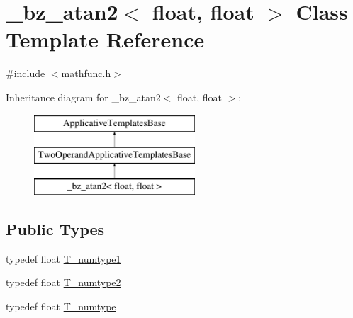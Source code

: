 \hypertarget{class__bz__atan2_3_01float_00_01float_01_4}{}\section{\+\_\+bz\+\_\+atan2$<$ float, float $>$ Class Template Reference}
\label{class__bz__atan2_3_01float_00_01float_01_4}


{\ttfamily \#include $<$mathfunc.\+h$>$}

Inheritance diagram for \+\_\+bz\+\_\+atan2$<$ float, float $>$\+:\begin{figure}[H]
\begin{center}
\leavevmode
\includegraphics[height=3.000000cm]{class__bz__atan2_3_01float_00_01float_01_4}
\end{center}
\end{figure}
\subsection*{Public Types}
\begin{DoxyCompactItemize}
\item 
typedef float \hyperlink{class__bz__atan2_3_01float_00_01float_01_4_a9010222958faf35b39d64435d13ac0e4}{T\+\_\+numtype1}
\item 
typedef float \hyperlink{class__bz__atan2_3_01float_00_01float_01_4_a096f32debf3cf0e75bf955ef2c6fd44e}{T\+\_\+numtype2}
\item 
typedef float \hyperlink{class__bz__atan2_3_01float_00_01float_01_4_a9dc9e00c8eb66cce61fb805cd67b0497}{T\+\_\+numtype}
\end{DoxyCompactItemize}
